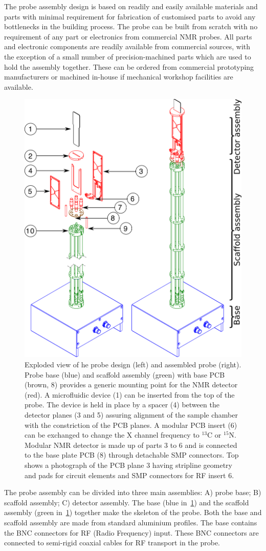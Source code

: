 \documentclass[preprint,12pt]{article}
\begin{document}
The probe assembly design is based on readily and easily available materials and parts with minimal requirement for fabrication of customised parts to avoid any bottlenecks in the building process. The probe can be built from scratch with no requirement of any part or electronics from commercial NMR probes. All parts and electronic components are readily available from commercial sources, with the exception of a small number of precision-machined parts which are used to hold the assembly together. These can be ordered from commercial prototyping manufacturers or machined in-house if mechanical workshop facilities are available.\par
\begin{figure}
\centering
\includegraphics[width=.5\linewidth,keepaspectratio=true]{./figures/ms5n17-tlp-im-181007-Probe-explode.png} 
\caption{Exploded view of he probe design (left) and assembled probe (right). Probe base (blue) and scaffold assembly (green) with base PCB (brown, 8) provides a generic mounting point for the NMR detector (red). A microfluidic device (1) can be inserted from the top of the probe. The device is held in place by a spacer (4) between the detector planes (3 and 5) assuring alignment of the sample chamber with the constriction of the PCB planes. A modular PCB insert (6) can be exchanged to change the X channel frequency to $^{13}$C or $^{15}$N. Modular NMR detector is made up of parts 3 to 6 and is connected to the base plate PCB (8) through detachable SMP connectors. Top shows a photograph of the PCB plane 3 having stripline geometry and pads for circuit elements and SMP connectors for RF insert 6. }
\label{fig:probe-explode} 
\end{figure}
The probe assembly can be divided into three main assemblies: A) probe base; B) scaffold assembly; C) detector assembly. The  base (blue in~\ref{fig:probe-explode}) and the scaffold assembly (green in~\ref{fig:probe-explode}) together make the skeleton of the probe. Both the base and scaffold assembly are made from standard aluminium profiles. The base contains the BNC connectors for RF (Radio Frequency) input. These BNC connectors are connected to semi-rigid coaxial cables for RF transport in the probe.\par
\end{document}
